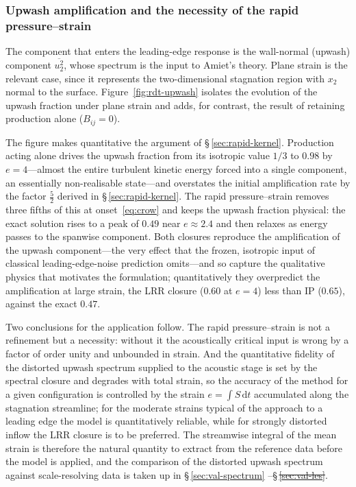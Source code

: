 \documentclass[lineno]{JFM-FLM_Au}
\providecommand{\DIFadd}[1]{{\protect\color{blue}\uwave{#1}}} %
\providecommand{\DIFdel}[1]{{\protect\color{red}\sout{#1}}}                      %
\providecommand{\DIFaddbegin}{} %
\providecommand{\DIFaddend}{} %
\providecommand{\DIFdelbegin}{} %
\providecommand{\DIFdelend}{} %
\begin{document}
\subsubsection{Upwash amplification and the necessity of the rapid
pressure--strain}\label{sec:upwash-verif}

The component that enters the leading-edge response is the wall-normal
(upwash) component $\overline{u_2^2}$, whose spectrum is the input to
Amiet's theory. Plane strain is the relevant case, since it represents the
two-dimensional stagnation region with $x_2$ normal to the surface.
Figure~\ref{fig:rdt-upwash} isolates the evolution of the upwash fraction
under plane strain and adds, for contrast, the result of retaining
production alone ($B_{ij}=0$).

The figure makes quantitative the argument of \S\,\ref{sec:rapid-kernel}.
Production acting alone drives the upwash fraction from its isotropic value
$1/3$ to $0.98$ by $e=4$---almost the entire turbulent kinetic energy
forced into a single component, an essentially non-realisable state---and
overstates the initial amplification rate by the factor $\tfrac52$ derived
in \S\,\ref{sec:rapid-kernel}. The rapid pressure--strain removes three
fifths of this at onset~\eqref{eq:crow} and keeps the upwash fraction
physical: the exact solution rises to a peak of $0.49$ near $e\approx2.4$
and then relaxes as energy passes to the spanwise component. Both closures
reproduce the amplification of the upwash component---the very effect that
the frozen, isotropic input of classical leading-edge-noise prediction
omits---and so capture the qualitative physics that motivates the
formulation; quantitatively they overpredict the amplification at large
strain, the LRR closure ($0.60$ at $e=4$) less than IP ($0.65$), against
the exact $0.47$.

Two conclusions for the application follow. The rapid pressure--strain is
not a refinement but a necessity: without it the acoustically critical
input is wrong by a factor of order unity and unbounded in strain. And the
quantitative fidelity of the distorted upwash spectrum supplied to the
acoustic stage is set by the spectral closure and degrades with total
strain, so the accuracy of the method for a given configuration is
controlled by the strain $e=\int S\,\mathrm{d}t$ accumulated along the
stagnation streamline; for the moderate strains typical of the approach to
a leading edge the model is quantitatively reliable, while for strongly
distorted inflow the LRR closure is to be preferred. The streamwise
integral of the mean strain is therefore the natural quantity to extract
from the reference data before the model is applied, and the comparison of
the distorted upwash spectrum against scale-resolving data is taken up in
\S\,\ref{sec:val-spectrum} \DIFaddbegin \DIFadd{and against external data in
\S\,\ref{sec:cmk}}\DIFaddend --\S\,\DIFdelbegin \DIFdel{\ref{sec:val-les}}\DIFdelend \DIFaddbegin \DIFadd{\ref{sec:lr-validation}}\DIFaddend .
\end{document}
